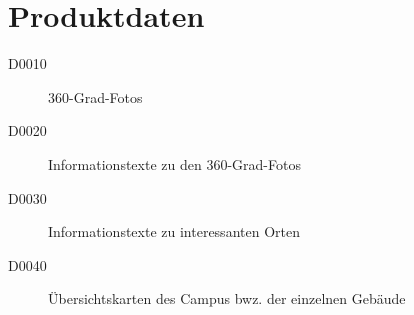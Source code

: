 \section{Produktdaten}
\label{sec:Produktdaten}

\begin{description}
  \item[D0010] 360-Grad-Fotos
  \item[D0020] Informationstexte zu den 360-Grad-Fotos
  \item[D0030] Informationstexte zu interessanten Orten
  \item[D0040] Übersichtskarten des Campus bwz. der einzelnen Gebäude
\end{description}